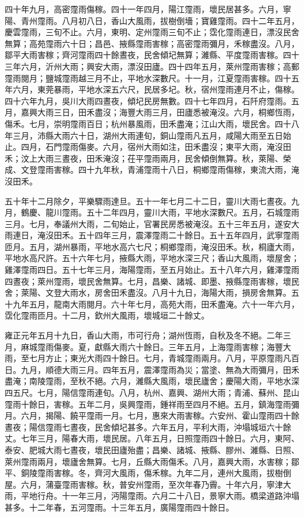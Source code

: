 \begin{pinyinscope}
四十年九月，高密霪雨傷稼。四十一年四月，陽江霪雨，壞民居甚多。六月，寧陽、青州霪雨。八月初八日，香山大風雨，拔樹倒墻；寶雞霪雨。四十二年五月，慶雲霪雨，三旬不止。六月，東明、定州霪雨三旬不止；霑化霪雨連日，漂沒民舍無算；高苑霪雨六十日；昌邑、掖縣霪雨害稼；高密霪雨彌月，禾稼盡沒。八月，鄒平大雨害稼；齊河霪雨四十餘晝夜，民舍傾圮無算；濰縣、平度霪雨害稼。四十三年六月，沂州大雨；興安大雨，漂沒田廬。四十四年五月，萊州霪雨害稼；高郵霪雨閱月；鹽城霪雨越三月不止，平地水深數尺。十一月，江夏霪雨害稼。四十五年六月，東莞暴雨，平地水深五六尺，民居多圮。秋，宿州霪雨連月不止，傷稼。四十六年九月，吳川大雨四晝夜，傾圮民房無數。四十七年四月，石阡府霪雨。五月，嘉興大雨三日，田禾盡沒；海豐大雨三月，田廬悉被淹沒。六月，桐鄉恆雨，傷禾。七月，崇明霪雨百日；杭州暴風雨，田禾盡淹；江山大雨，壞民舍。四十八年三月，沛縣大雨六十日，湖州大雨連旬，銅山霪雨凡五月，咸陽大雨至五日始止。四月，石門霪雨傷麥。六月，宿州大雨如注，田禾盡沒；東平大雨，淹沒田禾；汶上大雨三晝夜，田禾淹沒；茌平霪雨兩月，民舍傾倒無算。秋，萊陽、榮成、文登霪雨害稼。四十九年秋，青浦霪雨十八日，桐鄉霪雨傷稼，東流大雨，淹沒田禾。

五十年十二月除夕，平樂驟雨達旦。五十一年七月二十二日，靈川大雨七晝夜。九月，鶴慶、龍川霪雨。五十二年四月，靈川大雨，平地水深數尺。五月，石城霪雨三月。七月，奉議州大雨，二旬始止，官署民房悉被淹沒。五十三年五月，遂安大雨連日，淹沒田禾。五十四年三月，震澤霪雨二十餘日。五十五年四月，武寧霪雨匝月。五月，湖州暴雨，平地水高六七尺；桐鄉霪雨，淹沒田禾。秋，桐廬大雨，平地水高尺許。五十六年七月，掖縣大雨，平地水深三尺；香山大風雨，壞屋舍；雞澤霪雨四日。五十七年三月，海陽霪雨，至五月始止。五十八年六月，雞澤霪雨四晝夜；萊州霪雨，壞民舍無算。七月，昌樂、諸城、即墨、掖縣霪雨害稼，壞民舍；萊陽、文登大雨水，房舍田禾盡沒。八月十九日，海陽大雨，損房舍無算。五十九年五月，龍南大雨閱月。六十年七月，高苑大雨，田禾盡淹。六十一年六月，霑化霪雨匝月。十二月，欽州大風雨，壞城垣二十餘丈。

雍正元年五月十九日，香山大雨，市可行舟；湖州恆雨，自秋及冬不絕。二年三月，麻城霪雨傷麥。夏，獻縣大雨六十餘日。三年五月，上海霪雨害稼；海豐大雨，至七月方止；東光大雨四十餘日。七月，青城霪雨兩月。八月，平原霪雨凡百日。九月，順德大雨三月。四年五月，震澤霪雨為災；當塗、無為大雨彌月，田禾盡淹；南陵霪雨，至秋不絕。六月，濰縣大風雨，壞民廬舍；慶陽大雨，平地水深四五尺。七月，陽信霪雨連旬。八月，杭州、嘉興、湖州大雨；青浦、蘇州、昆山霪雨十餘日，害稼。五年二月，吳興霪雨，鍾祥雨至四月不絕。五月，鎮海霪雨彌月。六月，揭陽、饒平霪雨一月。七月，惠來大雨害稼。六安州、霍山霪雨四十餘晝夜；陽信霪雨七晝夜，民舍傾圮甚多。六年五月，平利大雨，沖塌城垣六十餘丈。七年三月，陽春大雨，壞民居。八年五月，日照霪雨四十餘日。六月，東阿、泰安、肥城大雨七晝夜，壞民田廬殆盡；昌樂、諸城、掖縣、膠州、濰縣、日照、萊州霪雨兩月，壞廬舍無算。七月，丘縣大雨傷禾。八月，嘉興大雨，水害稼；鄒平、銅陵霪雨害稼。冬，齊河大風雨，傷禾稼。九年二月，連州大風雨，拔樹倒屋。六月，蒲臺霪雨害稼。秋，普安州霪雨，至次年春乃霽。十年六月，寧津大雨，平地行舟。十一年三月，沔陽霪雨。六月二十八日，景寧大雨。橋梁道路沖塌甚多。十二年春，五河霪雨。十三年五月，廣陽霪雨四十餘日。


\end{pinyinscope}
